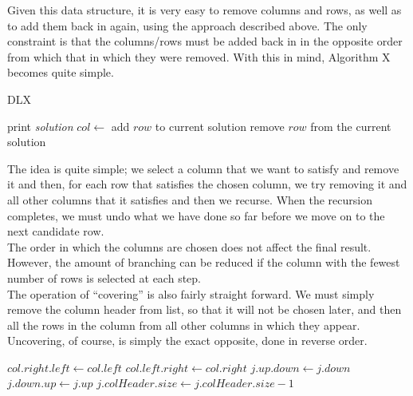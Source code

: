 \documentclass[12pt]{article}
\newcounter{row}
\newcounter{col}
\begin{document}
Given this data structure, it is very easy to remove columns and rows, as well as to add them back in again, using the approach described above. The only constraint is that the columns/rows must be added back in in the opposite order from which that in which they were removed. With this in mind, Algorithm X becomes quite simple. \\ 
\begin{algorithm}
\caption{DLX}\label{search}
\begin{algorithmic}[1]
\State print \textit{solution}
\State \Return
\EndIf
\State $col \gets$ 
\State {}
\State add $row$ to current solution
\State {}
\EndFor
\State {}
\State {}
\EndFor
\State remove $row$ from the current solution
\EndFor
\State {}
\EndProcedure
\end{algorithmic}
\end{algorithm}


The idea is quite simple; we select a column that we want to satisfy and remove it and then, for each row that satisfies the chosen column, we try removing it and all other columns that it satisfies and then we recurse. When the recursion completes, we must undo what we have done so far before we move on to the next candidate row. \\ 

The order in which the columns are chosen does not affect the final result. However, the amount of branching can be reduced if the column with the fewest number of rows is selected at each step. \\

The operation of ``covering'' is also fairly straight forward. We must simply remove the column header from list, so that it will not be chosen later, and then all the rows in the column from all other columns in which they appear. Uncovering, of course, is simply the exact opposite, done in reverse order. \\

\begin{algorithm}
\label{cover}
\begin{algorithmic}
\State $col.right.left \gets col.left$
\State $col.left.right \gets col.right$
\State $j.up.down \gets j.down$
\State $j.down.up \gets j.up$
\State $j.colHeader.size \gets j.colHeader.size - 1$
\EndFor
\EndFor
\EndProcedure
\end{algorithmic}
\end{algorithm}
\end{document}
